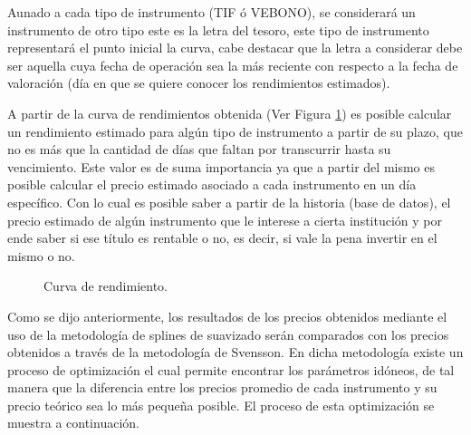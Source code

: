 \hspace{0.4cm} Aunado a cada tipo de instrumento (TIF \'o VEBONO), se considerar\'a un instrumento de otro tipo este es la letra del tesoro, este tipo de instrumento representar\'a el punto inicial la curva, cabe destacar que la letra a considerar debe ser aquella cuya fecha de operaci\'on sea la m\'as reciente con respecto a la fecha de valoraci\'on (d\'ia en que se quiere conocer los rendimientos estimados).


\hspace{0.4cm} A partir de la curva de rendimientos obtenida (Ver Figura \ref{c_rend}) es posible calcular un rendimiento estimado para alg\'un tipo de instrumento a partir de su plazo, que no es m\'as que la cantidad de d\'ias que faltan por transcurrir hasta su vencimiento. Este valor es de suma importancia ya que a partir del mismo es posible calcular el precio estimado asociado a cada instrumento en un d\'ia espec\'ifico. Con lo cual es posible saber a partir de la historia (base de datos), el precio estimado de alg\'un instrumento que le interese a cierta instituci\'on y por ende saber si ese t\'itulo es rentable o no, es decir, si vale la pena invertir en el mismo o no.

\begin{figure}[h]
\caption{Curva de rendimiento.}
\label{c_rend}
\end{figure}

\hspace{0.4cm} Como se dijo anteriormente, los resultados de los precios obtenidos mediante el uso de la metodolog\'ia de splines de suavizado ser\'an comparados con los precios obtenidos a trav\'es de la metodolog\'ia de Svensson. En dicha metodolog\'ia existe un proceso de optimizaci\'on el cual permite encontrar los par\'ametros id\'oneos, de tal manera que la diferencia entre los precios promedio de cada instrumento y su precio te\'orico sea lo m\'as peque\~na posible. El proceso de esta optimizaci\'on se muestra a continuaci\'on.


